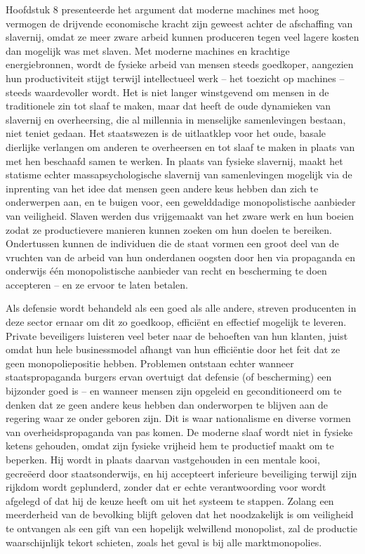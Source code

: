 Hoofdstuk 8 presenteerde het argument dat moderne machines met hoog vermogen de drijvende economische kracht zijn geweest achter de afschaffing van slavernij, omdat ze meer zware arbeid kunnen produceren tegen veel lagere kosten dan mogelijk was met slaven. Met moderne machines en krachtige energiebronnen, wordt de fysieke arbeid van mensen steeds goedkoper, aangezien hun productiviteit stijgt terwijl intellectueel werk -- het toezicht op machines -- steeds waardevoller wordt. Het is niet langer winstgevend om mensen in de traditionele zin tot slaaf te maken, maar dat heeft de oude dynamieken van slavernij en overheersing, die al millennia in menselijke samenlevingen bestaan, niet teniet gedaan. Het staatswezen is de uitlaatklep voor het oude, basale dierlijke verlangen om anderen te overheersen en tot slaaf te maken in plaats van met hen beschaafd samen te werken. In plaats van fysieke slavernij, maakt het statisme echter massapsychologische slavernij van samenlevingen mogelijk via de inprenting van het idee dat mensen geen andere keus hebben dan zich te onderwerpen aan, en te buigen voor, een gewelddadige monopolistische aanbieder van veiligheid. Slaven werden dus vrijgemaakt van het zware werk en hun boeien zodat ze productievere manieren kunnen zoeken om hun doelen te bereiken. Ondertussen kunnen de individuen die de staat vormen een groot deel van de vruchten van de arbeid van hun onderdanen oogsten door hen via propaganda en onderwijs één monopolistische aanbieder van recht en bescherming te doen accepteren -- en ze ervoor te laten betalen.

Als defensie wordt behandeld als een goed als alle andere, streven producenten in deze sector ernaar om dit zo goedkoop, efficiënt en effectief mogelijk te leveren. Private beveiligers luisteren veel beter naar de behoeften van hun klanten, juist omdat hun hele businessmodel afhangt van hun efficiëntie door het feit dat ze geen monopoliepositie hebben. Problemen ontstaan echter wanneer staatspropaganda burgers ervan overtuigt dat defensie (of bescherming) een bijzonder goed is -- en wanneer mensen zijn opgeleid en geconditioneerd om te denken dat ze geen andere keus hebben dan onderworpen te blijven aan de regering waar ze onder geboren zijn. Dit is waar nationalisme en diverse vormen van overheidspropaganda van pas komen. De moderne slaaf wordt niet in fysieke ketens gehouden, omdat zijn fysieke vrijheid hem te productief maakt om te beperken. Hij wordt in plaats daarvan vastgehouden in een mentale kooi, gecreëerd door staatsonderwijs, en hij accepteert inferieure beveiliging terwijl zijn rijkdom wordt geplunderd, zonder dat er echte verantwoording voor wordt afgelegd of dat hij de keuze heeft om uit het systeem te stappen. Zolang een meerderheid van de bevolking blijft geloven dat het noodzakelijk is om veiligheid te ontvangen als een gift van een hopelijk welwillend monopolist, zal de productie waarschijnlijk tekort schieten, zoals het geval is bij alle marktmonopolies.

